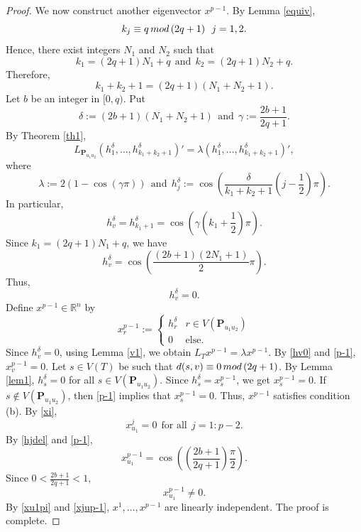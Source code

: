 \documentclass[10pt,a4paper]{amsart}
\newcommand{\p}{{\mathbf{P}}}
\newcommand{\rr}{\mathbb{R}}
\begin{document}
\begin{proof}
We now construct another eigenvector $x^{p-1}$. 
By Lemma \ref{equiv},
$$k_j\equiv q\,{\rm{mod}}\,(2q+1)~~j=1,2.$$ 
Hence, there exist integers $N_1$ and $N_2$ such that 
\[k_1=(2q+1)N_1+q~~\mbox{and}~~k_2=(2q+1)N_2+q.\] 
Therefore,
\begin{equation}\label{ksum}
    k_1+k_2+1=(2q+1)(N_1+N_2+1).
\end{equation}
Let $b$ be an integer in $[0,q)$. Put
\begin{equation} \label{deltadefn1}
\delta:=(2b+1)(N_1+N_2+1)~~\text{and}~~\gamma:=\frac{2b+1}{2q+1}. 
\end{equation}
By Theorem \ref{th1}, 
\[L_{\p_{u_1u_2}}(h_1^{\delta},\dotsc,h_{k_1+k_2+1}^{\delta})'=\lambda (h_1^{\delta},\dotsc,h_{k_1+k_2+1}^{\delta})',\]
where
\begin{equation}\label{hjdel}
 \lambda:=2\left(1-\cos (\gamma \pi) \right)~~\mbox{and}~~h_j^{\delta}:=\cos\left(\frac{\delta}{k_1+k_2+1} \left(j-\frac{1}{2} \right)\pi \right).   
\end{equation}
In particular, 
\[h_v^{\delta}=h_{k_1+1}^{\delta}=
        \cos \left(\gamma\left( k_1+\frac{1}{2} \right)\pi  \right).\]
Since $k_1=(2q+1)N_1+q$, we have
       $$h_v^{\delta}= \cos \left( \frac{(2b+1)(2N_1+1)}{2}\pi \right).$$
        Thus,  
        \begin{equation} \label{hv0}
            h_v^{\delta}=0.
        \end{equation}
        Define $x^{p-1}\in \rr^n$ by
\begin{equation}\label{p-1}
x^{p-1}_r:=
\begin{cases}
h_r^{\delta} & r\in V(\p_{u_1u_2}) \\
0 & \mbox{else.}
\end{cases}    
\end{equation}
Since $h_v^{\delta}=0$, using Lemma \ref{v1}, we obtain
$L_Tx^{p-1}=\lambda x^{p-1}$.
By \eqref{hv0} and \eqref{p-1},
$x^{p-1}_v=0$. Let $s\in V(T)$ be such that $d(s,v)\equiv 0\,{\rm{mod}}\,(2q+1)$. 
By Lemma  \ref{lem1}, 
$h_s^{\delta}=0$ for all $s\in V(\p_{u_1u_2})$.
Since $h_s^{\delta}=x_s^{p-1}$, we get $x_s^{p-1}=0$. If $s\notin V(\p_{u_1u_2})$, then \eqref{p-1} implies that $x_s^{p-1}=0$. Thus, $x^{p-1}$ satisfies condition (b).
By \eqref{xi},
\begin{equation}\label{xu1pi}
 x^j_{u_1}=0~~\mbox{for all}~~j=1:p-2.   
\end{equation}
By \eqref{hjdel} and \eqref{p-1},
\begin{equation*}
  x^{p-1}_{u_1}= \cos\left(\left( \frac{2b+1}{2q+1}\right)\frac{\pi}{2} \right). 
\end{equation*}
Since $0<\frac{2b+1}{2q+1}<1$, 
\begin{equation}\label{xjup-1}
  x^{p-1}_{u_1}\neq 0. 
\end{equation}
By \eqref{xu1pi} and \eqref{xjup-1}, $x^1,\dotsc,x^{p-1}$ are linearly independent.
The proof is complete.
\end{proof}
\end{document}
